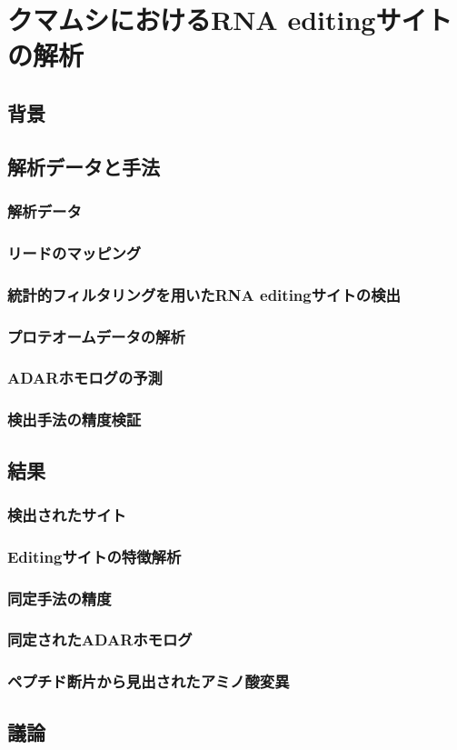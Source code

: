 \chapter{クマムシにおけるRNA editingサイトの解析}
\section{背景}
\section{解析データと手法}
\subsection{解析データ}
\subsection{リードのマッピング}
\subsection{統計的フィルタリングを用いたRNA editingサイトの検出}
\subsection{プロテオームデータの解析}
\subsection{ADARホモログの予測}
\subsection{検出手法の精度検証}
\section{結果}
\subsection{検出されたサイト}
\subsection{Editingサイトの特徴解析}
\subsection{同定手法の精度}
\subsection{同定されたADARホモログ}
\subsection{ペプチド断片から見出されたアミノ酸変異}
\section{議論}